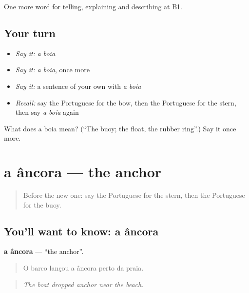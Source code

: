\begin{grammarlens}[title={What you've built}]
One more word for telling, explaining and describing at B1.
\end{grammarlens}

\subsection*{Your turn}
\begin{itemize}
\raggedright
  \item \emph{Say it:} \emph{a boia}
  \item \emph{Say it:} \emph{a boia}, once more
  \item \emph{Say it:} a sentence of your own with \emph{a boia}
  \item \emph{Recall:} say the Portuguese for the bow, then the Portuguese for the stern, then say \emph{a boia} again
\end{itemize}

\begin{tcolorbox}[breakable,colback=teal!4,colframe=teal!35!black,title={Before you move on}]
What does a boia mean? (\textquotedblleft{}The buoy; the float, the rubber ring\textquotedblright{}.) Say it once more.
\end{tcolorbox}
\section[a âncora]{a âncora — the anchor}

\label{lesson:PT-C420-ancora}



\begin{quote}
Before the new one: say the Portuguese for the stern, then the Portuguese for the buoy.
\end{quote}

\subsection*{You'll want to know: a âncora}
\textbf{a âncora} — \textquotedblleft{}the anchor\textquotedblright{}.

\begin{quote}
O barco lançou a âncora perto da praia.
\end{quote}

\begin{quote}
\emph{The boat dropped anchor near the beach.}
\end{quote}

